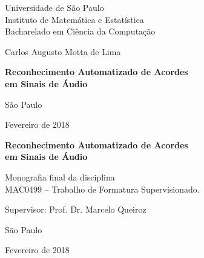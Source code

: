 \documentclass[12pt,twoside,a4paper]{book}
\begin{document}
\frontmatter 
\fancyhead[RO]{{\footnotesize\rightmark}\hspace{2em}\thepage}
\setcounter{tocdepth}{2}
\fancyhead[LE]{\thepage\hspace{2em}\footnotesize{\leftmark}}
\fancyhead[RE,LO]{}
\fancyhead[RO]{{\footnotesize\rightmark}\hspace{2em}\thepage}

\onehalfspacing  %

\thispagestyle{empty}
\begin{center}
    \vspace*{2.3cm}
    Universidade de São Paulo\\
    Instituto de Matemática e Estatística\\
    Bacharelado em Ciência da Computação


    \vspace*{3cm}
    \Large{Carlos Augusto Motta de Lima}
    

    \vspace{3cm}
    \textbf{\Large{Reconhecimento Automatizado de Acordes \\ em Sinais de Áudio}}
    

    \vskip 5cm
    \normalsize{São Paulo}

    \normalsize{Fevereiro de 2018}
\end{center}

%
\newpage
\thispagestyle{empty}
    \begin{center}
        \vspace*{2.3 cm}
        \textbf{\Large{Reconhecimento Automatizado de Acordes \\ em Sinais de Áudio}}
        \vspace*{2 cm}
    \end{center}

    \vskip 2cm

    \begin{flushright}
	Monografia final da disciplina \\
        MAC0499 -- Trabalho de Formatura Supervisionado.
    \end{flushright}

    \vskip 5cm

    \begin{center}
    Supervisor: Prof. Dr. Marcelo Queiroz

    \vskip 5cm
    \normalsize{São Paulo}

    \normalsize{Fevereiro de 2018}
    \end{center}
\pagebreak
\end{document}
